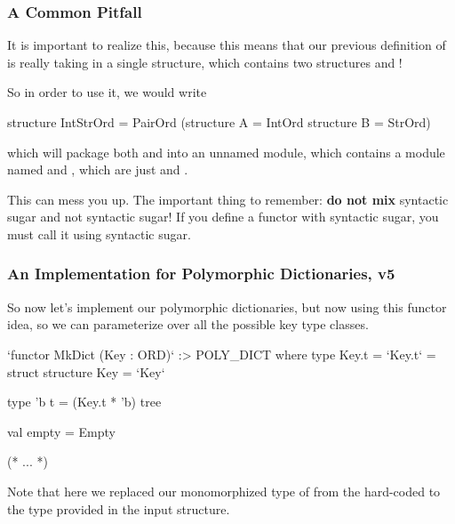 \documentclass[aspectratio=169, handout]{beamer}
\begin{document}
\begin{frame}[fragile]
  \frametitle{A Common Pitfall}

  It is important to realize this, because this means that our previous definition
  of  is really taking in a single structure, which contains two
  structures  and !

  \pause
  \vspace{\fill}

  So in order to use it, we would write
  \begin{codeblock}
    structure IntStrOrd = PairOrd (structure A = IntOrd
                                   structure B = StrOrd)
  \end{codeblock}

  which will package both  and  into an unnamed
  module, which contains a module named  and , which are just
   and .

  \pause
  \vspace{\fill}

  This can mess you up. The important thing to remember: \textbf{do not mix}
  syntactic sugar and not syntactic sugar! If you define a functor with syntactic
  sugar, you must call it using syntactic sugar.
\end{frame}

\begin{frame}[fragile]
  \frametitle{An Implementation for Polymorphic Dictionaries, v5}

  So now let's implement our polymorphic dictionaries, but now using this
  functor idea, so we can parameterize over all the possible key type classes.

  \pause
  \vspace{\fill}

  \begin{codeblock}
    `functor MkDict (Key : ORD)` :>
        POLY_DICT where type Key.t = `Key.t` =
      struct
        structure Key = `Key`

        type 'b t = (Key.t * 'b) tree

        val empty = Empty

      (* ... *)
  \end{codeblock}


  \pause
  \vspace{\fill}

  Note that here we replaced our monomorphized type of  from
  the hard-coded  to the  type provided in the input
  structure.
\end{frame}
\end{document}

